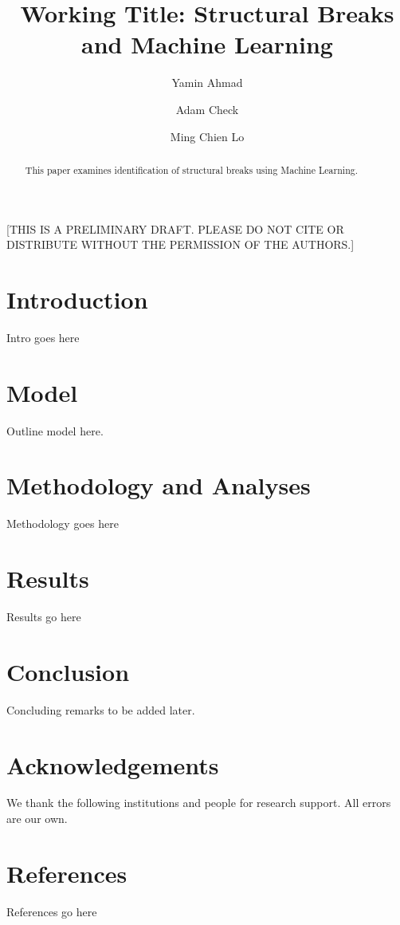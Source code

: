 \documentclass[authoryear]{elsarticle}
\begin{document}
\begin{frontmatter}

\title{Working Title: Structural Breaks and Machine Learning}


\author[a]{Yamin Ahmad}
\author[b]{Adam Check}
\author[c]{Ming Chien Lo}


\address[a]{University of Wisconsin - Whitewater, Department of Economics, Hyland Hall, 800 W. Main St, Whitewater WI 53190, USA}
\address[b]{University of St. Thomas, Dept. of Economics, Mail 5029, 2115 Summit Avenue, St. Paul, MN 55105, USA}
\address[c]{Metropolitan State University, Department of Economics and Finance, 1501 Hennepin Avenue, Minneapolis, MN 55403, USA }



\begin{abstract}
This paper examines identification of structural breaks using Machine Learning.
\end{abstract}

\end{frontmatter}

[THIS IS A PRELIMINARY DRAFT. PLEASE DO NOT CITE OR DISTRIBUTE WITHOUT THE PERMISSION OF THE AUTHORS.]

\section{Introduction}
Intro goes here

\section{Model}
Outline model here.


\section{Methodology and Analyses}
Methodology goes here

\section{Results}
Results go here

\section{Conclusion}
Concluding remarks to be added later.

\section*{Acknowledgements}
We thank the following institutions and people for research support. All errors are our own.


\section*{References}
References go here
\end{document}
